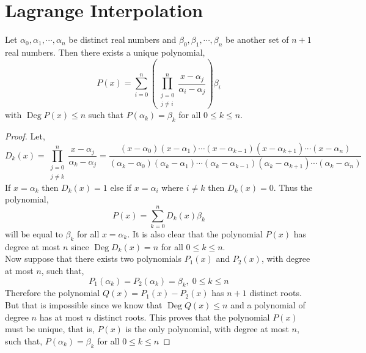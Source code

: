 \documentclass[11pt,numbers=noenddot,svgnames,dvipsnames]{scrartcl}
\DeclareMathOperator{\Deg}{Deg}
\begin{document}
\section{Lagrange Interpolation}

\begin{theorem}\label{thm:lagrange-interpol}
    Let $\alpha_{0}, \alpha_{1},\cdots , \alpha_{n}$ be distinct real numbers and 
    $\beta_{0}, \beta_{1}, \cdots, \beta_{n}$ be another set of $n+1$ real numbers. 
    Then there exists a unique polynomial,
    \[
    P(x) = 
    \sum_{i=0}^{n} \left( \prod_{\substack{j=0\\ j\neq i}}^{n} \frac{x - \alpha_{j}}{\alpha_{i} - \alpha_{j}} \right) \beta_{i}
    \]
    with $\Deg P(x) \leq n$ such that $P(\alpha_{k}) = \beta_{k}$ for all $0\leq k \leq n$.
\end{theorem}
\begin{proof}
    Let,
    \[
    D_{k}(x) = \prod_{\substack{j=0 \\ j\neq k}}^{n} \frac{x - \alpha_{j}}{\alpha_{k} - \alpha_{j}} = 
    \frac{(x-\alpha_{0})(x-\alpha_{1})\cdots (x - \alpha_{k-1})(x - \alpha_{k+1}) \cdots (x - \alpha_{n})}
         {(\alpha_{k}-\alpha_{0})(\alpha_{k}-\alpha_{1})\cdots (\alpha_{k} - \alpha_{k-1})(\alpha_{k} - \alpha_{k+1}) \cdots (\alpha_{k} - \alpha_{n})}
    \]
    If $x=\alpha_k$ then $D_k(x) = 1$ else if $x=\alpha_i$ where 
    $i \neq k$ then $D_k(x)=0$. Thus the polynomial,
    \[ P(x) = \sum_{k=0}^n D_k(x) \beta_k \]
    will be equal to $\beta_k$ for all $x=\alpha_k$. It is also clear that the 
    polynomial $P(x)$ has degree at most $n$ since $\Deg D_k(x)=n$ for all 
    $0 \leq k \leq n$. \\
    Now suppose that there exists two polynomials $P_1(x)$ and $P_2(x)$, with degree at 
    most $n$, such that,
    \[ P_1(\alpha_k) = P_2(\alpha_k) = \beta_k, \; 0\leq k \leq n\]
    Therefore the polynomial $Q(x) = P_1(x) - P_2(x)$ has $n+1$ distinct roots. 
    But that is impossible since we know that $\Deg Q(x) \leq n$ and 
    a polynomial of degree $n$ has at most $n$ distinct roots. This proves that 
    the polynomial $P(x)$ must be unique, that is, $P(x)$ is the only polynomial, with 
    degree at most $n$, such that, 
    $P(\alpha_k) = \beta_k$ for all $0 \leq k \leq n$
\end{proof}
\end{document}
